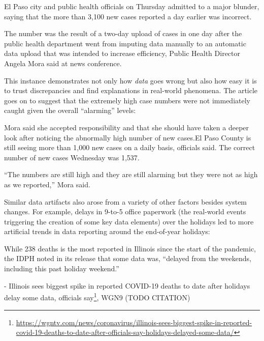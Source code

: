 \documentclass[
]{krantz}
\renewenvironment{quote}{\begin{VF}}{\end{VF}}
\renewcommand{\href}[2]{#2\footnote{\url{#1}}}
\begin{document}
\begin{quote}
El Paso city and public health officials on Thursday admitted to a major blunder, saying that the more than 3,100 new cases reported a day earlier was incorrect.
\end{quote}

\begin{quote}
The number was the result of a two-day upload of cases in one day after the public health department went from imputing data manually to an automatic data upload that was intended to increase efficiency, Public Health Director Angela Mora said at news conference.
\end{quote}

This instance demonstrates not only how \emph{data} goes wrong but also how easy it is to trust discrepancies and find explanations in real-world phenomena.
The article goes on to suggest that the extremely high case numbers were not immediately caught given the overall ``alarming'' levels:

\begin{quote}
Mora said she accepted responsibility and that she should have taken a deeper look after noticing the abnormally high number of new cases.El Paso County is still seeing more than 1,000 new cases on a daily basis, officials said. The correct number of new cases Wednesday was 1,537.
\end{quote}

\begin{quote}
``The numbers are still high and they are still alarming but they were not as high as we reported,'' Mora said.
\end{quote}

Similar data artifacts also arose from a variety of other factors besides system changes. For example, delays in 9-to-5 office paperwork (the real-world events triggering the creation of some key data elements) over the holidays led to more artificial trends in data reporting around the end-of-year holidays:

\begin{quote}
While 238 deaths is the most reported in Illinois since the start of the pandemic, the IDPH noted in its release that some data was, ``delayed from the weekends, including this past holiday weekend.''
\end{quote}

- \href{https://wgntv.com/news/coronavirus/illinois-sees-biggest-spike-in-reported-covid-19-deaths-to-date-after-officials-say-holidays-delayed-some-data/}{Illinois sees biggest spike in reported COVID-19 deaths to date after holidays delay some data, officials say}, WGN9 (TODO CITATION)
\end{document}
